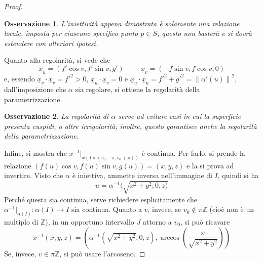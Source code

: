 \documentclass[12pt]{article}
\theoremstyle{style}
\newtheorem{osservazione}{Osservazione}[section]
\numberwithin{equation}{subsection}
\begin{document}
\begin{proof}
	\begin{osservazione}
	L'iniettivit\`a appena dimostrata \`e solamente una relazione locale, imposta per ciascuno specifico punto $p \in S$; questo non baster\`a e si dovr\`a estendere con ulteriori ipotesi.
	\end{osservazione}
	\noindent Quanto alla regolarit\`a, si vede che
	\[
	\underline{x}_u = (f ' \cos v, f ' \sin v , g') \hspace{1cm} \underline{x}_v = (-f \sin v , f \cos v , 0)
	\] 
	e, essendo $\underline{x}_v \cdot \underline{x}_v = f'^2 > 0$, $\underline{x}_u \cdot \underline{x}_v =0$ e $\underline{x}_u \cdot  \underline{x}_u = f'^2 + g'^2 = \left\lVert \alpha '(u) \right\rVert ^2$, dall'imposizione che $\alpha $ sia regolare, si ottiene la regolarit\`a della parametrizzazione.
	\begin{osservazione}
	La regolarit\`a di $\alpha $ serve ad evitare casi in cui la superficie presenta cuspidi, o altre irregolarit\`a; inoltre, questo garantisce anche la regolarit\`a della parametrizzazione.
	\end{osservazione}
	\noindent Infine, si mostra che $\underline{x}^{-1}|_{\underline{x}(I \times (v_0-\pi,v_0+\pi))}  $ \`e continua.
	Per farlo, si prende la relazione $(f(u) \cos v , f(u) \sin v, g(u)) = (x,y,z)$ e la si prova ad invertire.
	Visto che $\alpha $ \`e iniettiva, ammette inversa nell'immagine di $I$, quindi si ha
	\[
	u = \alpha ^{-1}(\sqrt{x^2 + y^2 , 0 , z)} 
	\] 
	Perch\'e questa sia continua, serve richiedere esplicitamente che $\alpha ^{-1}|_{\alpha (I)} : \alpha (I) \to I$ sia continua.
	Quanto a $v$, invece, se $v_0 \not \in \pi \mathbb{Z}$ (cio\`e non \`e un multiplo di $\mathbb{Z}$), in un opportuno intervallo $J$ attorno a $v_0$, si pu\`o ricavare
	\[
	x^{-1}(x,y,z) = \left(\alpha ^{-1}(\sqrt{x^2 + y^2 } ,0,z) , \arccos \left(\frac{x}{\sqrt{x^2 + y^2} }\right) \right) 
	\] 
	Se, invece, $v \in \pi \mathbb{Z}$, si pu\`o usare l'arcoseno.
\end{proof}
\end{document}
